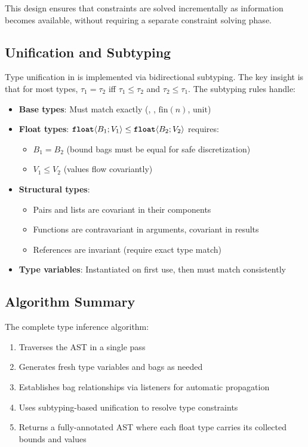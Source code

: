 This design ensures that constraints are solved incrementally as information becomes available, without requiring a separate constraint solving phase.

\subsection{Unification and Subtyping}

Type unification in \Slice{} is implemented via bidirectional subtyping. The key insight is that for most types, $\tau_1 = \tau_2$ iff $\tau_1 \leq \tau_2$ and $\tau_2 \leq \tau_1$. The subtyping rules handle:

\begin{itemize}
    \item \textbf{Base types}: Must match exactly (\bool{}, \intty{}, $\text{fin}(n)$, $\text{unit}$)
    \item \textbf{Float types}: $\text{\ttfamily\bfseries float}\langle B_1; V_1 \rangle \leq \text{\ttfamily\bfseries float}\langle B_2; V_2 \rangle$ requires:
        \begin{itemize}
            \item $B_1 = B_2$ (bound bags must be equal for safe discretization)
            \item $V_1 \leq V_2$ (values flow covariantly)
        \end{itemize}
    \item \textbf{Structural types}: 
        \begin{itemize}
            \item Pairs and lists are covariant in their components
            \item Functions are contravariant in arguments, covariant in results
            \item References are invariant (require exact type match)
        \end{itemize}
    \item \textbf{Type variables}: Instantiated on first use, then must match consistently
\end{itemize}

\subsection{Algorithm Summary}

The complete type inference algorithm:
\begin{enumerate}
    \item Traverses the AST in a single pass
    \item Generates fresh type variables and bags as needed
    \item Establishes bag relationships via listeners for automatic propagation
    \item Uses subtyping-based unification to resolve type constraints
    \item Returns a fully-annotated AST where each float type carries its collected bounds and values
\end{enumerate}

